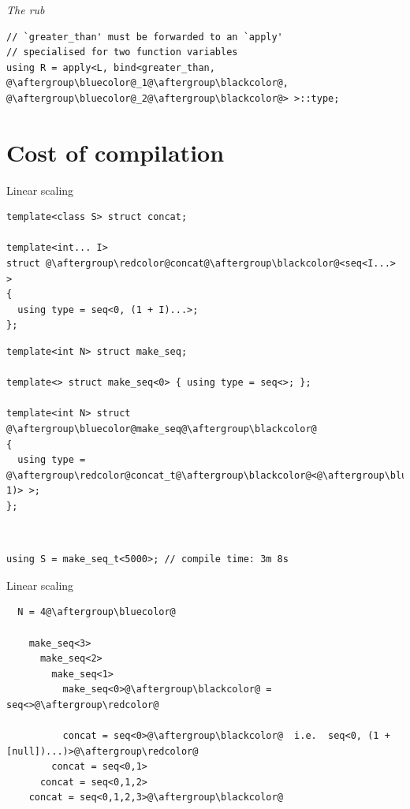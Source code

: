 \documentclass[xcolor=dvipsnames]{beamer}
\begin{document}
\begin{frame}[fragile]{\emph{The rub}}
\begin{lstlisting}
// `greater_than' must be forwarded to an `apply'
// specialised for two function variables
using R = apply<L, bind<greater_than, @\aftergroup\bluecolor@_1@\aftergroup\blackcolor@, @\aftergroup\bluecolor@_2@\aftergroup\blackcolor@> >::type;
\end{lstlisting}
\end{frame}


\section{Cost of compilation}


\begin{frame}[fragile]{Linear scaling}
\begin{lstlisting}
template<class S> struct concat;

template<int... I>
struct @\aftergroup\redcolor@concat@\aftergroup\blackcolor@<seq<I...> >
{
  using type = seq<0, (1 + I)...>;
};
\end{lstlisting}

\begin{lstlisting}
template<int N> struct make_seq;

template<> struct make_seq<0> { using type = seq<>; };

template<int N> struct @\aftergroup\bluecolor@make_seq@\aftergroup\blackcolor@
{
  using type = @\aftergroup\redcolor@concat_t@\aftergroup\blackcolor@<@\aftergroup\bluecolor@make_seq_t@\aftergroup\blackcolor@<(N-1)> >;
};
\end{lstlisting}

~

\begin{lstlisting}
using S = make_seq_t<5000>; // compile time: 3m 8s
\end{lstlisting}
\end{frame}


\begin{frame}[fragile]{Linear scaling}
\begin{lstlisting}
  N = 4@\aftergroup\bluecolor@

    make_seq<3>
      make_seq<2>
        make_seq<1>
          make_seq<0>@\aftergroup\blackcolor@ = seq<>@\aftergroup\redcolor@

          concat = seq<0>@\aftergroup\blackcolor@  i.e.  seq<0, (1 + [null])...)>@\aftergroup\redcolor@
        concat = seq<0,1>
      concat = seq<0,1,2>
    concat = seq<0,1,2,3>@\aftergroup\blackcolor@
\end{lstlisting}
\end{frame}
\end{document}
